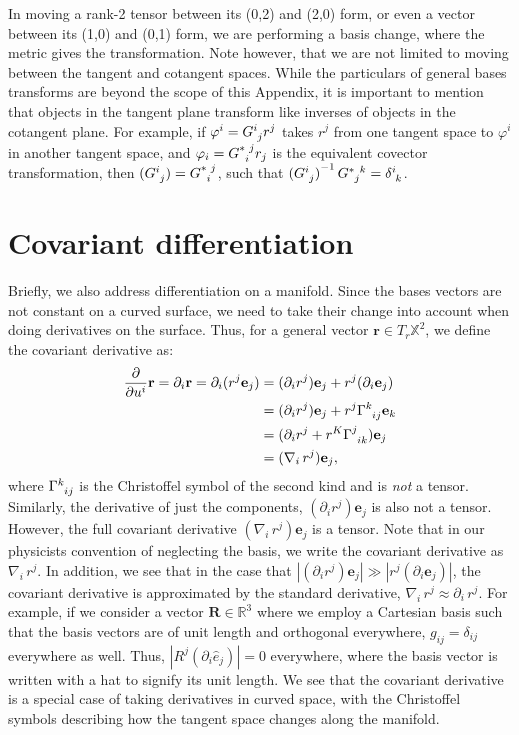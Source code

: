 \begin{appendices}
In moving a rank-2 tensor between its (0,2) and (2,0) form, or even a vector between its (1,0) and (0,1) form, we are performing a basis change, where the metric gives the transformation.
Note however, that we are not limited to moving between the tangent and cotangent spaces.
While the particulars of general bases transforms are beyond the scope of this Appendix, it is important to mention that objects in the tangent plane transform like inverses of objects in the cotangent plane.
For example, if $\varphi^i = \tensor{G}{^i_j}r^j$ takes $r^j$ from one tangent space to $\varphi^i$ in another tangent space, and $\varphi_i = \tensor{G}{^*_i^j}r_j$ is the equivalent covector transformation, then $(\tensor{G}{^i_j}) = \tensor{G}{^*_i^j}$, such that ${(\tensor{G}{^i_j})}^{-1}\,\tensor{G}{^*_j^k} = \tensor{\delta}{^i_k}$.



\section{Covariant differentiation}
Briefly, we also address differentiation on a manifold.
Since the bases vectors are not constant on a curved surface, we need to take their change into account when doing derivatives on the surface.
Thus, for a general vector $\mathbf{r} \in T_r\mathbb{X}^2$, we define the covariant derivative as:
\begin{align}
  \frac{\partial}{\partial u^i} \mathbf{r} = \partial_i \mathbf{r} = \partial_i (r^j \mathbf{e}_j) &= (\partial_i r^j)\mathbf{e}_j + r^j(\partial_i \mathbf{e}_j) \nonumber \\
  &= (\partial_i r^j)\mathbf{e}_j + r^j \tensor{\Gamma}{^k_{ij}} \mathbf{e}_k \nonumber \\
  &= (\partial_i r^j + r^K \tensor{\Gamma}{^j_{ik}}) \mathbf{e}_j \nonumber \\
  &= (\nabla_i\,r^j)\mathbf{e}_j,
\end{align}
where $\tensor{\Gamma}{^k_{ij}}$ is the Christoffel symbol of the second kind and is \emph{not} a tensor.
Similarly, the derivative of just the components, $(\partial_i r^j)\mathbf{e}_j$ is also not a tensor.
However, the full covariant derivative $(\nabla_i\,r^j)\mathbf{e}_j$ is a tensor.
Note that in our physicists convention of neglecting the basis, we write the covariant derivative as $\nabla_i\,r^j$.
In addition, we see that in the case that $|(\partial_i r^j)\mathbf{e}_j| \gg |r^j(\partial_i \mathbf{e}_j)|$, the covariant derivative is approximated by the standard derivative, $\nabla_i\,r^j \approx \partial_i \, r^j$.
For example, if we consider a vector $\mathbf{R} \in  \mathbb{R}^3$ where we employ a Cartesian basis such that the basis vectors are of unit length and orthogonal everywhere, $g_{ij} = \delta_{ij}$ everywhere as well.
Thus, $|R^j(\partial_i \hat{e}_j)| = 0$ everywhere, where the basis vector is written with a hat to signify its unit length.
We see that the covariant derivative is a special case of taking derivatives in curved space, with the Christoffel symbols describing how the tangent space changes along the manifold.





\end{appendices}
